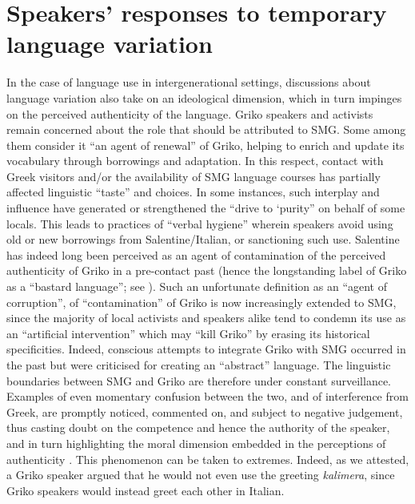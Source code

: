 \documentclass[output=paper,hidelinks]{langscibook}
\begin{document}
\section{Speakers' responses to temporary language variation}
\label{sec:key:4.1}
In the case of language use in intergenerational settings, discussions about language variation also take on an ideological dimension, which in turn impinges on the perceived authenticity of the language. Griko speakers and activists remain concerned about the role that should be attributed to SMG. Some among them consider it ``an agent of renewal'' of Griko, helping to enrich and update its vocabulary through borrowings and adaptation. In this respect, contact with Greek visitors and/or the availability of SMG language courses has partially affected linguistic ``taste'' and choices. In some instances, such interplay and influence have generated or strengthened the ``drive to ‘purity'' on behalf of some locals. This leads to practices of ``verbal hygiene'' \citep{Cameron1995} wherein speakers avoid using old or new borrowings from Salentine/Italian, or sanctioning such use. Salentine has indeed long been perceived as an agent of contamination of the perceived authenticity of Griko in a pre-contact past (hence the longstanding label of Griko as a ``bastard language''; see \citealt{Pellegrino2016b}). Such an unfortunate definition as an ``agent of corruption'', of ``contamination'' of Griko is now increasingly extended to SMG, since the majority of local activists and speakers alike tend to condemn its use as an ``artificial intervention'' which may ``kill Griko'' by erasing its historical specificities. Indeed, conscious attempts to integrate Griko with SMG occurred in the past but were criticised for creating an ``abstract'' language. The linguistic boundaries between SMG and Griko are therefore under constant surveillance. Examples of even momentary confusion between the two, and of interference from Greek, are promptly noticed, commented on, and subject to negative judgement, thus casting doubt on the competence and hence the authority of the speaker, and in turn highlighting the moral dimension embedded in the perceptions of authenticity \citep{Pellegrino2016b, Pellegrino2021}. This phenomenon can be taken to extremes. Indeed, as we attested, a Griko speaker argued that he would not even use the greeting \textit{kalimera}, since Griko speakers would instead greet each other in Italian. 
\end{document}
